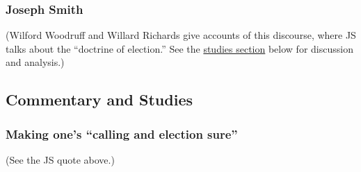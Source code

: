 	\subsubsection{Joseph Smith} %
		\label{ELECTION-JS}
	
		\begin{compactdesc}
			\item[{\hyperref[EMS-1839-JS-CIR-26-JUN-CIR-2-JUL-1839]{Between circa 26 June and circa 2 July 1839}}] (Wilford Woodruff and Willard Richards give accounts of this discourse, where JS talks about the ``doctrine of election.'' See the \hyperref[ELECTION-calling]{studies section} below for discussion and analysis.)
		\end{compactdesc}
		
	
	
	
	
\subsection{Commentary and Studies} %
	\label{ELECTION-COMMENTARY}

	
		
	\subsubsection{Making one's ``calling and election sure''}
		\label{ELECTION-calling}
		
		(See the JS quote above.)
